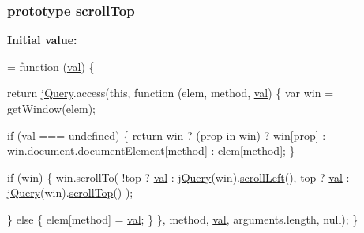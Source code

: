 \subsubsection[{\texorpdfstring{scroll\+Top}{scrollTop}}]{ {\bf prototype} scroll\+Top}\hypertarget{jquery-2_82_81-vsdoc_8js_a1b81b50a7190916ff4f07febc824b85d}{}\label{jquery-2_82_81-vsdoc_8js_a1b81b50a7190916ff4f07febc824b85d}
{\bfseries Initial value\+:}
\begin{DoxyCode}
= \textcolor{keyword}{function} (\hyperlink{jquery-2_82_81-vsdoc_8js_a0888cacd53defa08fbb4972d54ece4b0}{val}) \{
        

        \textcolor{keywordflow}{return} \hyperlink{jquery-2_82_81-vsdoc_8js_add5237586d970a38a81f990e8eb28c6c}{jQuery}.access(\textcolor{keyword}{this}, \textcolor{keyword}{function} (elem, method, \hyperlink{jquery-2_82_81-vsdoc_8js_a0888cacd53defa08fbb4972d54ece4b0}{val}) \{
            var win = getWindow(elem);

            \textcolor{keywordflow}{if} (\hyperlink{jquery-2_82_81-vsdoc_8js_a0888cacd53defa08fbb4972d54ece4b0}{val} === \hyperlink{jquery-2_82_81-vsdoc_8js_a08113a236cc18d2a9d5ce27e638012be}{undefined}) \{
                \textcolor{keywordflow}{return} win ? (\hyperlink{jquery-2_82_81-vsdoc_8js_af17be84954030af6c2286f5da385d41b}{prop} in win) ? win[\hyperlink{jquery-2_82_81-vsdoc_8js_af17be84954030af6c2286f5da385d41b}{prop}] :
                    win.document.documentElement[method] :
                    elem[method];
            \}

            \textcolor{keywordflow}{if} (win) \{
                win.scrollTo(
                    !top ? \hyperlink{jquery-2_82_81-vsdoc_8js_a0888cacd53defa08fbb4972d54ece4b0}{val} : \hyperlink{jquery-2_82_81-vsdoc_8js_add5237586d970a38a81f990e8eb28c6c}{jQuery}(win).\hyperlink{jquery-2_82_81-vsdoc_8js_accc573ddf4124d723e9a6da272bb24f2}{scrollLeft}(),
                    top ? \hyperlink{jquery-2_82_81-vsdoc_8js_a0888cacd53defa08fbb4972d54ece4b0}{val} : \hyperlink{jquery-2_82_81-vsdoc_8js_add5237586d970a38a81f990e8eb28c6c}{jQuery}(win).\hyperlink{jquery-2_82_81-vsdoc_8js_a1b81b50a7190916ff4f07febc824b85d}{scrollTop}()
                );

            \} \textcolor{keywordflow}{else} \{
                elem[method] = \hyperlink{jquery-2_82_81-vsdoc_8js_a0888cacd53defa08fbb4972d54ece4b0}{val};
            \}
        \}, method, \hyperlink{jquery-2_82_81-vsdoc_8js_a0888cacd53defa08fbb4972d54ece4b0}{val}, arguments.length, null);
    \}
\end{DoxyCode}
